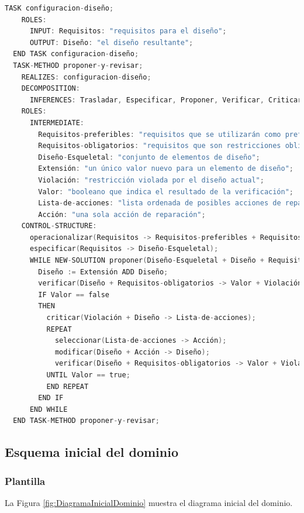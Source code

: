\newpage

\begin{lstlisting}[language=C,caption=\textbf{Código de la plantilla de configuración}]
  TASK configuracion-diseño;
    ROLES:
      INPUT: Requisitos: "requisitos para el diseño";
      OUTPUT: Diseño: "el diseño resultante";
  END TASK configuracion-diseño;
  TASK-METHOD proponer-y-revisar;
    REALIZES: configuracion-diseño;
    DECOMPOSITION:
      INFERENCES: Trasladar, Especificar, Proponer, Verificar, Criticar, Seleccionar, Modificar;
    ROLES:
      INTERMEDIATE:
        Requisitos-preferibles: "requisitos que se utilizarán como preferencias (suaves)";
        Requisitos-obligatorios: "requisitos que son restricciones obligatorias (estrictas)";
        Diseño-Esqueletal: "conjunto de elementos de diseño";
        Extensión: "un único valor nuevo para un elemento de diseño";
        Violación: "restricción violada por el diseño actual";
        Valor: "booleano que indica el resultado de la verificación";
        Lista-de-acciones: "lista ordenada de posibles acciones de reparación (fijación)";
        Acción: "una sola acción de reparación";
    CONTROL-STRUCTURE:
      operacionalizar(Requisitos -> Requisitos-preferibles + Requisitos-obligatorios);
      especificar(Requisitos -> Diseño-Esqueletal);
      WHILE NEW-SOLUTION proponer(Diseño-Esqueletal + Diseño + Requisitos-preferibles -> Extensión) DO
        Diseño := Extensión ADD Diseño;
        verificar(Diseño + Requisitos-obligatorios -> Valor + Violación);
        IF Valor == false
        THEN
          criticar(Violación + Diseño -> Lista-de-acciones);
          REPEAT
            seleccionar(Lista-de-acciones -> Acción);
            modificar(Diseño + Acción -> Diseño);
            verificar(Diseño + Requisitos-obligatorios -> Valor + Violación);
          UNTIL Valor == true;
          END REPEAT
        END IF
      END WHILE
  END TASK-METHOD proponer-y-revisar;
\end{lstlisting}

\subsection{Esquema inicial del dominio}

\subsubsection{Plantilla}
La Figura \ref{fig:DiagramaInicialDominio} muestra el diagrama inicial del dominio.

